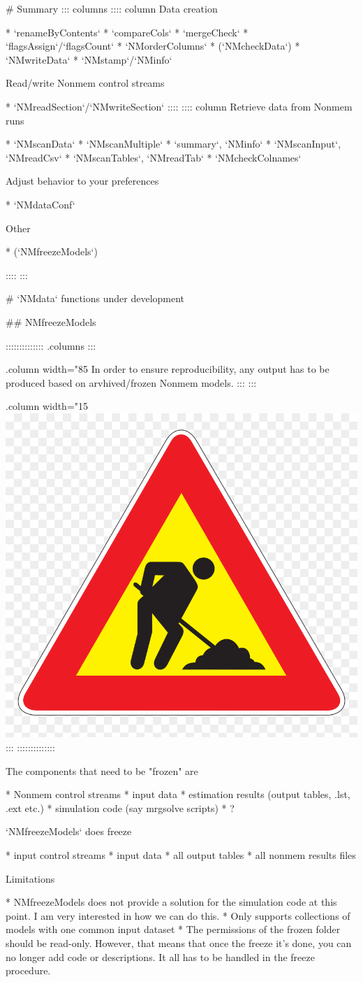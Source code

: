 {{{{{{# Summary
::: columns
:::: column
Data creation

* `renameByContents` 
* `compareCols`
* `mergeCheck`
* `flagsAssign`/`flagsCount`
* `NMorderColumns`
* (`NMcheckData`)
* `NMwriteData`
* `NMstamp`/`NMinfo` 

Read/write Nonmem control streams

* `NMreadSection`/`NMwriteSection`
::::
:::: column
Retrieve data from Nonmem runs

* `NMscanData`
* `NMscanMultiple`
* `summary`, `NMinfo`
* `NMscanInput`, `NMreadCsv`
* `NMscanTables`, `NMreadTab`
* `NMcheckColnames`

Adjust behavior to your preferences

* `NMdataConf`

Other

* (`NMfreezeModels`)

:::: 
:::



# `NMdata` functions under development 




## NMfreezeModels

:::::::::::::: {.columns}
::: {.column width="85%
In order to ensure reproducibility, any output has to be produced based on arvhived/frozen Nonmem models. 
::: 
::: {.column width="15%
\includegraphics[width=.5in]{figures/worksign.png}
::: 
::::::::::::::

The components that need to be "frozen" are 

* Nonmem control streams
* input data
* estimation results (output tables, .lst, .ext etc.) 
* simulation code (say mrgsolve scripts)
* ?

`NMfreezeModels` does freeze

* input control streams
* input data
* all output tables
* all nonmem results files

Limitations

* NMfreezeModels does not provide a solution for the simulation code at this point. I am very interested in how we can do this.
* Only supports collections of models with one common input dataset
* The permissions of the frozen folder should be read-only. However,
that means that once the freeze it's done, you can no longer add
code or descriptions. It all has to be handled in the freeze
procedure.


}}}}}}}}
